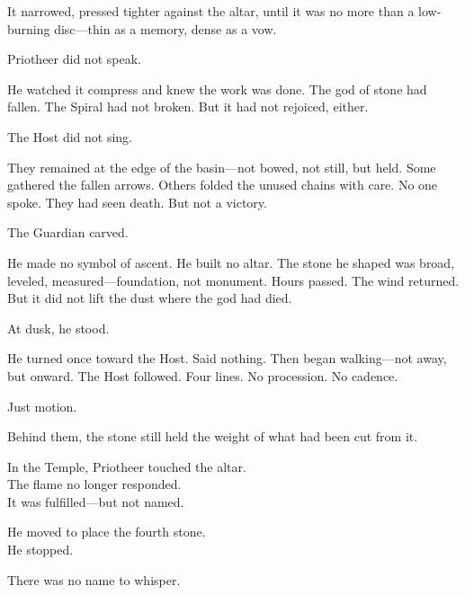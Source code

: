 \documentclass[9pt]{article}
\begin{document}
\vspace{0.5em}
It narrowed, pressed tighter against the altar, until it was no more than a low-burning disc---thin as a memory, dense as a vow.

\vspace{0.5em}
Priotheer did not speak.

\vspace{0.5em}
He watched it compress and knew the work was done. The god of stone had fallen. The Spiral had not broken. But it had not rejoiced, either.

\vspace{0.5em}
The Host did not sing.

\vspace{0.5em}
They remained at the edge of the basin---not bowed, not still, but held. Some gathered the fallen arrows. Others folded the unused chains with care. No one spoke. They had seen death. But not a victory.

\vspace{0.5em}
The Guardian carved.

\vspace{0.5em}
He made no symbol of ascent. He built no altar. The stone he shaped was broad, leveled, measured---foundation, not monument. Hours passed. The wind returned. But it did not lift the dust where the god had died.

\vspace{0.5em}
At dusk, he stood.

\vspace{0.5em}
He turned once toward the Host. Said nothing. Then began walking---not away, but onward. The Host followed. Four lines. No procession. No cadence.

\vspace{0.5em}
Just motion.

\vspace{0.5em}
Behind them, the stone still held the weight of what had been cut from it.

\vspace{0.5em}
In the Temple, Priotheer touched the altar.\\
The flame no longer responded.\\
It was fulfilled---but not named.

\vspace{0.5em}
He moved to place the fourth stone.\\
He stopped.

\vspace{0.5em}
There was no name to whisper.
\end{document}
